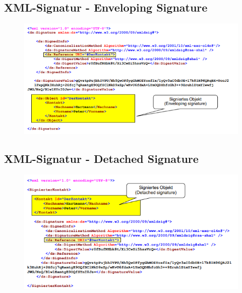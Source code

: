 \subsection{XML-Signatur - Enveloping Signature}
\begin{figure}[H]
	\begin{center}
		\includegraphics[scale=0.8]{Resources/EnvelopingSignature}
		\caption{}
		\label{fig:EvelopingSignature}
	\end{center}
\end{figure}

\subsection{XML-Signatur - Detached Signature}
\begin{figure}[H]
	\begin{center}
		\includegraphics[scale=0.8]{Resources/DetachedSignature}
		\caption{}
		\label{fig:DetachedSignature}
	\end{center}
\end{figure}

